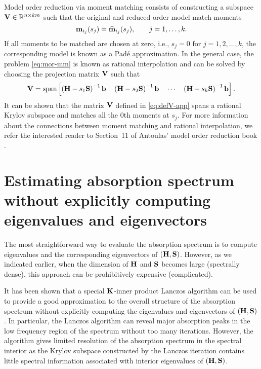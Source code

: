 Model order reduction via moment matching consists of constructing a subspace $\bV \inR[n][km]$ such that the original and reduced order model match moments
\begin{equation}
  \mathbf{m}_{i_j}(s_j) = \widehat{\mathbf{m}}_{i_j}(s_j), \qquad j = 1,\ldots,k.
  \label{eq:mor-mm}
\end{equation}
If all moments to be matched are chosen at zero, i.e., $s_j = 0$ for $j = 1,2,\ldots,k$, the corresponding model is known as a Pad\'{e} approximation. In the general case, the problem \eqref{eq:mor-mm} is known as rational interpolation and can be solved by choosing the projection matrix $\mathbf{V}$ such that
\begin{equation}
  \mathbf{V} = \mathrm{span}\left[  \left( \mathbf{H} - s_1\mathbf{S} \right)^{-1} \mathbf{b} \quad
                   \left( \mathbf{H} - s_2\mathbf{S} \right)^{-1} \mathbf{b} \quad
                    \cdots \quad
                   \left( \mathbf{H} - s_k\mathbf{S} \right)^{-1} \mathbf{b}  \right].
  \label{eq:defV-app}
\end{equation}
It can be shown that the matrix $\mathbf{V}$ defined in \eqref{eq:defV-app} spans a rational Krylov subspace and matches all the $0$th moments at $s_j$. For more information about the connections between moment matching and rational interpolation, we refer the interested reader to Section~11 of Antoulas' model order reduction book \cite{Antoulas2005}.

\section{Estimating absorption spectrum without explicitly computing eigenvalues and eigenvectors}
\label{sec:est}

The most straightforward way to evaluate the absorption spectrum is to compute eigenvalues and the corresponding eigenvectors of $(\mathbf{H},\mathbf{S})$. However, as we indicated earlier, when the dimension of $\mathbf{H}$ and $\mathbf{S}$ becomes large (spectrally dense), this approach can be prohibitively expensive (complicated). 

It has been shown \cite{brabec_etal2015} that a special $\mathbf{K}$-inner product
Lanczos algorithm can be used to provide a good approximation to the overall
structure of the absorption spectrum without explicitly computing the
eigenvalues and eigenvectors of $(\mathbf{H},\mathbf{S})$.  In particular, the Lanczos
algorithm can reveal major absorption peaks in the low frequency region of the
spectrum without too many iterations. However, the algorithm gives limited
resolution of the absorption spectrum in the spectral interior as the
Krylov subspace constructed by the Lanczos iteration contains little spectral
information associated with interior eigenvalues of $(\mathbf{H},\mathbf{S})$.

